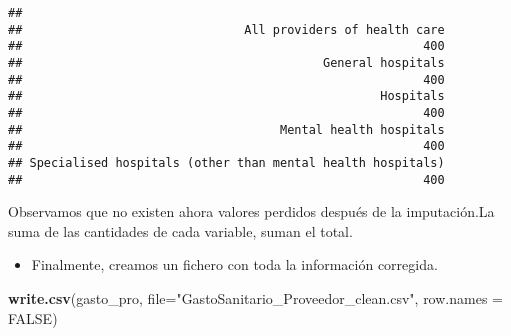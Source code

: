 \documentclass[]{article}
\newenvironment{Shaded}{\begin{snugshade}}{\end{snugshade}}
\newcommand{\DataTypeTok}[1]{\textcolor[rgb]{0.13,0.29,0.53}{#1}}
\newcommand{\KeywordTok}[1]{\textcolor[rgb]{0.13,0.29,0.53}{\textbf{#1}}}
\newcommand{\NormalTok}[1]{#1}
\newcommand{\OtherTok}[1]{\textcolor[rgb]{0.56,0.35,0.01}{#1}}
\newcommand{\StringTok}[1]{\textcolor[rgb]{0.31,0.60,0.02}{#1}}
\providecommand{\tightlist}{%
  \setlength{\itemsep}{0pt}\setlength{\parskip}{0pt}}
\begin{document}
\begin{verbatim}
## 
##                               All providers of health care 
##                                                        400 
##                                          General hospitals 
##                                                        400 
##                                                  Hospitals 
##                                                        400 
##                                    Mental health hospitals 
##                                                        400 
## Specialised hospitals (other than mental health hospitals) 
##                                                        400
\end{verbatim}

Observamos que no existen ahora valores perdidos después de la
imputación.La suma de las cantidades de cada variable, suman el total.

\begin{itemize}
\tightlist
\item
  Finalmente, creamos un fichero con toda la información corregida.
\end{itemize}

\begin{Shaded}
\begin{Highlighting}[]
\KeywordTok{write.csv}\NormalTok{(gasto_pro, }\DataTypeTok{file=}\StringTok{"GastoSanitario_Proveedor_clean.csv"}\NormalTok{, }\DataTypeTok{row.names =} \OtherTok{FALSE}\NormalTok{)}
\end{Highlighting}
\end{Shaded}
\end{document}
